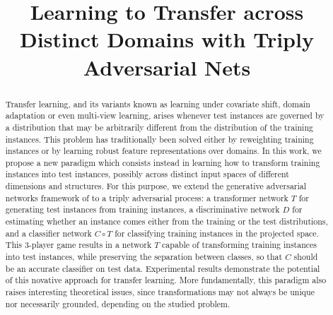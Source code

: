 \documentclass[aoas,preprint,authoryear]{imsart}
\begin{document}
\begin{frontmatter}
\title{Learning to Transfer across Distinct Domains with Triply Adversarial Nets}


\author{ }

\begin{abstract}

Transfer learning, and its variants known as learning under covariate shift,
domain adaptation or even multi-view learning, arises whenever test instances are
governed by a distribution that may be arbitrarily different from the
distribution of the training instances. This problem has traditionally been
solved either by reweighting training instances or by learning robust feature
representations over domains. In this work, we propose a new paradigm which
consists instead in learning how to transform training instances into test
instances, possibly across distinct input spaces of different dimensions and
structures. For this purpose, we extend the generative adversarial networks
framework of \cite{goodfellow2014generative} to a triply adversarial process: a
transformer network $T$ for generating test instances from training instances, a
discriminative network $D$ for estimating whether an instance comes either from
the training or the test distributions, and a classifier network $C \circ T$ for
classifying training instances in the projected space. This 3-player game
results in a network $T$ capable of transforming training instances into test
instances, while preserving the separation between classes, so that $C$ should
be an accurate classifier on test data. Experimental results demonstrate the
potential of this novative approach for transfer learning.
More fundamentally, this paradigm
also raises interesting theoretical issues, since transformations may not always
be unique nor necessarily grounded, depending on the studied problem.


\end{abstract}

\end{frontmatter}
\end{document}
